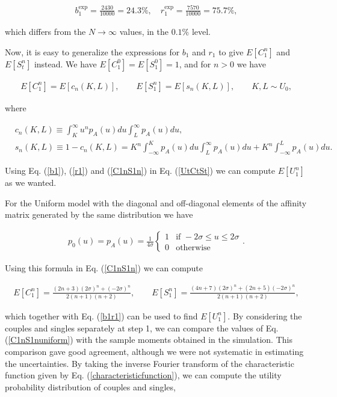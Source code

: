 \documentclass[12pt]{article}
\begin{document}
\begin{align}
    b_1^{\textrm{exp}}=\frac{2430}{10000}=24.3\%,\quad r_1^{\textrm{exp}}=\frac{7570}{10000}=75.7\%,
\end{align}

\noindent which differs from the $N\rightarrow\infty$ values, in the $0.1\%$ level.

Now, it is easy to generalize the expressions for $b_1$ and $r_1$ to give $E[C^n_1]$ and $E[S_t^n]$ instead. We have $E[C_1^0]=E[S_1^0]=1$, and for $n>0$ we have

\begin{align}
    E[C_1^n]=E[c_n(K,L)],\qquad E[S_1^n]=E[s_n(K,L)],\qquad K,L\sim U_0,
    \label{C1nS1n}
\end{align}

\noindent where

\begin{align}
    & c_n(K,L)\equiv\int_K^\infty u^np_A(u)du\int_L^\infty p_A(u)du,\label{cnsingle}\\
    & s_n(K,L)\equiv 1-c_n(K,L)= K^n\int_{-\infty}^Kp_A(u)du\int_L^\infty p_A(u)du+K^n\int_{-\infty}^Lp_A(u)du.\label{snsingle}
\end{align}

\noindent Using Eq. (\ref{b1}), (\ref{r1}) and (\ref{C1nS1n}) in Eq. (\ref{UtCtSt}) we can compute $E[U_1^n]$ as we wanted.

For the Uniform model with the diagonal and off-diagonal elements of the affinity matrix generated by the same distribution we have 

\begin{align}
    p_0(u)=p_A(u)=\frac{1}{4\sigma}\begin{cases} 1 & \textrm{if }-2\sigma\leq u\leq 2\sigma \\ 0 
    & \textrm{otherwise}\end{cases}.
    \label{p0}
\end{align}

\noindent Using this formula in Eq. (\ref{C1nS1n}) we can compute

\begin{align}
    E[C_1^n]=\frac{(2 n+3) (2\sigma)^n+(-2\sigma)^n}{2(n+1) (n+2)},\qquad E[S_1^n]=\frac{(4 n+7) (2\sigma)^n+(2 n+5) (-2\sigma)^n}{2 (n+1) (n+2)},\label{C1nS1nuniform}
\end{align}

\noindent which together with Eq. (\ref{b1r1}) can be used to find $E[U_1^n]$. By considering the couples and singles separately at step 1, we can compare the values of Eq. (\ref{C1nS1nuniform}) with the sample moments obtained in the simulation. This comparison gave good agreement, although we were not systematic in estimating the uncertainties. By taking the inverse Fourier transform of the characteristic function given by Eq. (\ref{characteristicfunction}), we can compute the utility probability distribution of couples and singles, 
\end{document}
